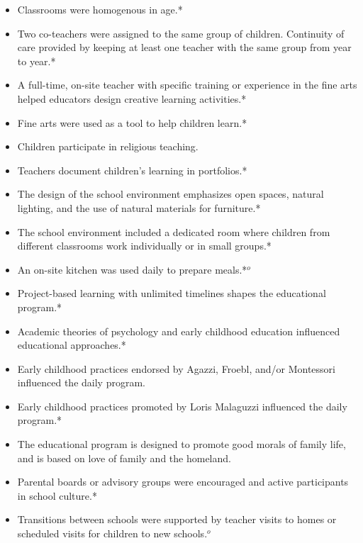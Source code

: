 \begin{itemize}
\begin{itemize}
 	\item Classrooms were homogenous in age.*
 	\item Two co-teachers were assigned to the same group of children. Continuity of care provided by keeping at least one teacher with the same group from year to year.*
 	\item A full-time, on-site teacher with specific training or experience in the fine arts helped educators design creative learning activities.*
 	\item Fine arts were used as a tool to help children learn.*
 	\item Children participate in religious teaching.
 	\item Teachers document children's learning in portfolios.*
 	\item The design of the school environment emphasizes open spaces, natural lighting, and the use of natural materials for furniture.*
 	\item The school environment included a dedicated room where children from different classrooms work individually or in small groups.*
 	\item An on-site kitchen was used daily to prepare meals.*$^o$
 	\item Project-based learning with unlimited timelines shapes the educational program.*
 	\item Academic theories of psychology and early childhood education influenced educational approaches.*
 	\item Early childhood practices endorsed by Agazzi, Froebl, and/or Montessori influenced the daily program.
 	\item Early childhood practices promoted by Loris Malaguzzi influenced the daily program.*
 	\item The educational program is designed to promote good morals of family life, and is based on love of family and the homeland.
 	\item Parental boards or advisory groups were encouraged and active participants in school culture.*
	\item Transitions between schools were supported by teacher visits to homes or scheduled visits for children to new schools.$^o$
 \end{itemize}
 \end{itemize}

\doublespacing

